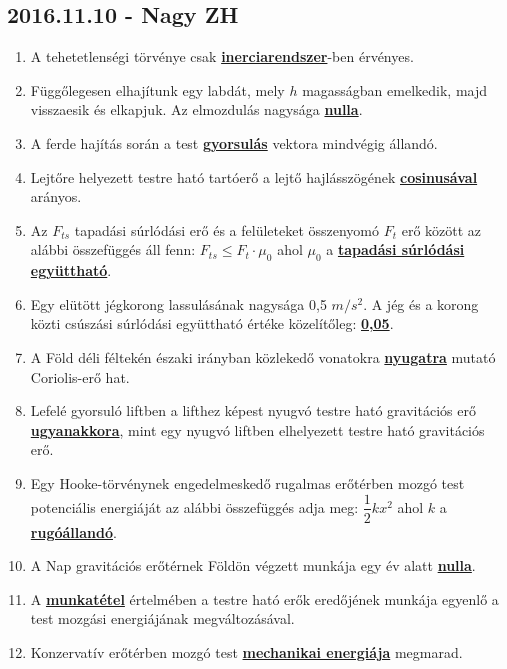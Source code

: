 \documentclass[../../fizika_kerdesek.tex]{subfiles}
\begin{document}
    \subsection{2016.11.10 - Nagy ZH}

        \begin{enumerate}
            \item A tehetetlenségi törvénye csak \underline{\textbf{inerciarendszer}}-ben érvényes.
            \item Függőlegesen elhajítunk egy labdát, mely $h$ magasságban emelkedik, majd visszaesik és elkapjuk. Az elmozdulás nagysága \underline{\textbf{nulla}}.
            \item A ferde hajítás során a test \underline{\textbf{gyorsulás}} vektora  mindvégig állandó.
            \item Lejtőre helyezett testre ható tartóerő a lejtő hajlásszögének \underline{\textbf{cosinusával}} arányos.
            \item Az $F_{ts}$ tapadási súrlódási erő és a felületeket összenyomó $F_t$ erő között az alábbi összefüggés áll fenn: \underline{\textbf{$F_{ts} \le F_t \cdot \mu_0$}} ahol $\mu_0$ a \underline{\textbf{tapadási súrlódási együttható}}.
            \item Egy elütött jégkorong lassulásának nagysága 0,5 $m/s^2$. A jég és a korong közti csúszási súrlódási együttható értéke közelítőleg: \underline{\textbf{0,05}}.
            \item A Föld déli féltekén északi irányban közlekedő vonatokra \underline{\textbf{nyugatra}} mutató Coriolis-erő hat.
            \item Lefelé gyorsuló liftben a lifthez képest nyugvó testre ható gravitációs erő \underline{\textbf{ugyanakkora}}, mint egy nyugvó liftben elhelyezett testre ható gravitációs erő.
            \item Egy Hooke-törvénynek engedelmeskedő rugalmas erőtérben mozgó test potenciális energiáját az alábbi összefüggés adja meg: \underline{\textbf{$\dfrac{1}{2}kx^2$}} ahol $k$ a \underline{\textbf{rugóállandó}}.
            \item A Nap gravitációs erőtérnek Földön végzett munkája egy év alatt \underline{\textbf{nulla}}.
            \item A \underline{\textbf{munkatétel}} értelmében a testre ható erők eredőjének munkája egyenlő a test mozgási energiájának megváltozásával.
            \item Konzervatív erőtérben mozgó test \underline{\textbf{mechanikai energiája}} megmarad.
        \end{enumerate}

    \underline{\textbf{}}
\end{document}
